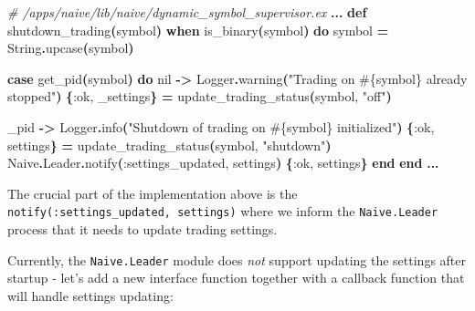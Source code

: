 \documentclass[
  oneside]{book}
\newenvironment{Shaded}{\begin{snugshade}}{\end{snugshade}}
\newcommand{\CommentTok}[1]{\textcolor[rgb]{0.56,0.35,0.01}{\textit{#1}}}
\newcommand{\ConstantTok}[1]{\textcolor[rgb]{0.56,0.35,0.01}{#1}}
\newcommand{\FunctionTok}[1]{\textcolor[rgb]{0.13,0.29,0.53}{\textbf{#1}}}
\newcommand{\KeywordTok}[1]{\textcolor[rgb]{0.13,0.29,0.53}{\textbf{#1}}}
\newcommand{\NormalTok}[1]{#1}
\newcommand{\OperatorTok}[1]{\textcolor[rgb]{0.81,0.36,0.00}{\textbf{#1}}}
\newcommand{\OtherTok}[1]{\textcolor[rgb]{0.56,0.35,0.01}{#1}}
\newcommand{\StringTok}[1]{\textcolor[rgb]{0.31,0.60,0.02}{#1}}
\newcommand{\VariableTok}[1]{\textcolor[rgb]{0.00,0.00,0.00}{#1}}
\begin{document}
\begin{Shaded}
\begin{Highlighting}[]
\CommentTok{\# /apps/naive/lib/naive/dynamic\_symbol\_supervisor.ex}
  \OperatorTok{...}
  \KeywordTok{def}\NormalTok{ shutdown\_trading}\FunctionTok{(}\NormalTok{symbol}\FunctionTok{)} \KeywordTok{when}\NormalTok{ is\_binary}\FunctionTok{(}\NormalTok{symbol}\FunctionTok{)} \KeywordTok{do}
\NormalTok{    symbol }\OperatorTok{=} \ConstantTok{String}\OperatorTok{.}\NormalTok{upcase}\FunctionTok{(}\NormalTok{symbol}\FunctionTok{)}

    \KeywordTok{case}\NormalTok{ get\_pid}\FunctionTok{(}\NormalTok{symbol}\FunctionTok{)} \KeywordTok{do}
      \ConstantTok{nil} \OperatorTok{{-}\textgreater{}}
        \ConstantTok{Logger}\OperatorTok{.}\NormalTok{warning}\FunctionTok{(}\StringTok{"Trading on }\OtherTok{\#\{}\NormalTok{symbol}\OtherTok{\}}\StringTok{ already stopped"}\FunctionTok{)}
        \FunctionTok{\{}\VariableTok{:ok}\NormalTok{, \_settings}\FunctionTok{\}} \OperatorTok{=}\NormalTok{ update\_trading\_status}\FunctionTok{(}\NormalTok{symbol, }\StringTok{"off"}\FunctionTok{)}

\NormalTok{      \_pid }\OperatorTok{{-}\textgreater{}}
        \ConstantTok{Logger}\OperatorTok{.}\NormalTok{info}\FunctionTok{(}\StringTok{"Shutdown of trading on }\OtherTok{\#\{}\NormalTok{symbol}\OtherTok{\}}\StringTok{ initialized"}\FunctionTok{)}
        \FunctionTok{\{}\VariableTok{:ok}\NormalTok{, settings}\FunctionTok{\}} \OperatorTok{=}\NormalTok{ update\_trading\_status}\FunctionTok{(}\NormalTok{symbol, }\StringTok{"shutdown"}\FunctionTok{)}
        \ConstantTok{Naive}\OperatorTok{.}\ConstantTok{Leader}\OperatorTok{.}\NormalTok{notify}\FunctionTok{(}\VariableTok{:settings\_updated}\NormalTok{, settings}\FunctionTok{)}
        \FunctionTok{\{}\VariableTok{:ok}\NormalTok{, settings}\FunctionTok{\}}
    \KeywordTok{end}
  \KeywordTok{end}
  \OperatorTok{...}
\end{Highlighting}
\end{Shaded}

The crucial part of the implementation above is the \texttt{notify(:settings\_updated,\ settings)} where we inform the \texttt{Naive.Leader} process that it needs to update trading settings.

Currently, the \texttt{Naive.Leader} module does \emph{not} support updating the settings after startup - let's add a new interface function together with a callback function that will handle settings updating:
\end{document}
